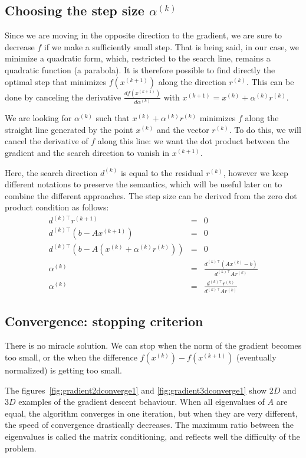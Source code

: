 \documentclass[notitlepage,oneside]{book}
\begin{document}
\subsection{Choosing the step size $\alpha^{(k)}$}
Since we are moving in the opposite direction to the gradient, we are sure to decrease $f$ if we make a sufficiently small step.
That is being said, in our case, we minimize a quadratic form, which, restricted to the search line, remains a quadratic function (a parabola).
It is therefore possible to find directly the optimal step that minimizes $f(x^{(k+1)})$ along the direction $r^{(k)}$.
This can be done by canceling the derivative $\frac{df\left(x^{(k+1)}\right)}{d\alpha^{(k)}}$ with $x^{(k+1)}=x^{(k)}+\alpha^{(k)} r^{(k)}$.

We are looking for $\alpha^{(k)}$ such that $x^{(k)}+\alpha^{(k)} r^{(k)}$ minimizes $f$ along the straight line
generated by the point $x^{(k)}$ and the vector $r^{(k)}$.
To do this, we will cancel the derivative of $f$ along this line:
we want the dot product between the gradient and the search direction to vanish in $x^{(k+1)}$.

Here, the search direction $d^{(k)}$ is equal to the residual $r^{(k)}$, however we keep different notations to preserve the semantics,
which will be useful later on to combine the different approaches.
The step size can be derived from the zero dot product condition as follows:
\begin{eqnarray*}
  d^{(k)\top}r^{(k+1)} &= &0 \\
  d^{(k)\top}\left(b-Ax^{(k+1)}\right) &= &0 \\
  d^{(k)\top}\left(b-A(x^{(k)}+\alpha^{(k)} r^{(k)})\right) &= &0 \\
  \alpha^{(k)}   &=& \frac{d^{(k)\top}\left(Ax^{(k)}-b\right)}{d^{(k)\top}Ar^{(k)}}\\
  \alpha^{(k)} &=& \frac{d^{(k)\top}r^{(k)}}{d^{(k)\top}Ar^{(k)}} 
\end{eqnarray*}

\subsection{Convergence: stopping criterion}
There is no miracle solution. We can stop when the norm of the gradient becomes too small,
or the when the difference $f\left(x^{(k)}\right)-f\left(x^{(k+1)}\right)$ (eventually normalized) is getting too small.

The figures~\ref{fig:gradient2dconverge1} and \ref{fig:gradient3dconverge1} show $2D$ and $3D$ examples of the gradient descent behaviour.
When all eigenvalues of $A$ are equal, the algorithm converges in one iteration, but when they are very different, the speed of convergence drastically decreases.
The maximum ratio between the eigenvalues is called the matrix conditioning, and reflects well the difficulty of the problem.
\end{document}
